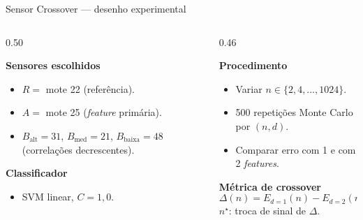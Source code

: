 \documentclass[aspectratio=169, 11pt]{beamer}
\begin{document}
\begin{frame}{Sensor Crossover --- desenho experimental}

\begin{columns}[T]
\begin{column}{0.50\textwidth}

\textbf{Sensores escolhidos}
\begin{itemize}
  \item $R = $ mote 22 (referência).
  \item $A = $ mote 25 (\textit{feature} primária).
  \item $B_{\text{alt}} = 31$, $B_{\text{med}} = 21$, $B_{\text{baixa}} = 48$
        (correlações decrescentes).
\end{itemize}

\vspace{0.4em}
\textbf{Classificador}
\begin{itemize}
  \item SVM linear, $C = 1{,}0$.
\end{itemize}

\end{column}
\begin{column}{0.46\textwidth}

\textbf{Procedimento}
\begin{itemize}
  \item Variar $n \in \{2, 4, \ldots, 1024\}$.
  \item 500 repetições Monte Carlo por $(n, d)$.
  \item Comparar erro com 1 e com 2 \textit{features}.
\end{itemize}

\vspace{0.4em}
\textbf{Métrica de crossover}
\[
  \Delta(n) = E_{d=1}(n) - E_{d=2}(n)
\]
$n^{\star}$: troca de sinal de $\Delta$.

\end{column}
\end{columns}

\end{frame}
\end{document}
